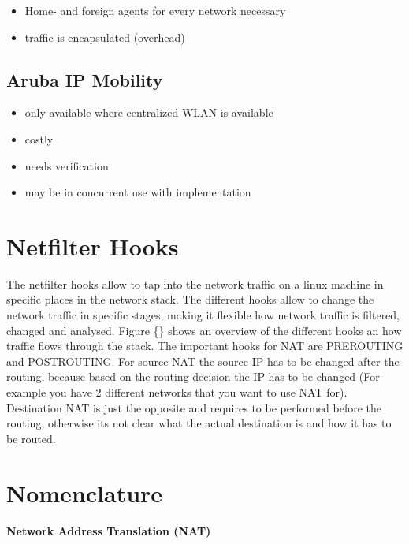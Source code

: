 \documentclass{report}
\begin{document}
\begin{itemize}
\itemsep1pt\parskip0pt
\item
  Home- and foreign agents for every network necessary
\item
  traffic is encapsulated (overhead)
\end{itemize}

\subsection{Aruba IP Mobility}\label{aruba-ip-mobility}

\begin{itemize}
\itemsep1pt\parskip0pt
\item
  only available where centralized WLAN is available
\item
  costly
\item
  needs verification
\item
  may be in concurrent use with implementation
\end{itemize}


\section{Netfilter Hooks}\label{netfilter-hooks}

The netfilter hooks\cite{hooks} allow to tap into the network traffic on a linux
machine in specific places in the network stack. The different hooks
allow to change the network traffic in specific stages, making it
flexible how network traffic is filtered, changed and analysed. Figure
\{\} shows an overview of the different hooks an how traffic flows
through the stack. The important hooks for NAT are PREROUTING and
POSTROUTING. For source NAT the source IP has to be changed after the
routing, because based on the routing decision the IP has to be changed
(For example you have 2 different networks that you want to use NAT
for). Destination NAT is just the opposite and requires to be performed
before the routing, otherwise its not clear what the actual destination
is and how it has to be routed.


\section{Nomenclature}\label{nomenclature}

\paragraph{Network Address Translation (NAT)}
\end{document}
